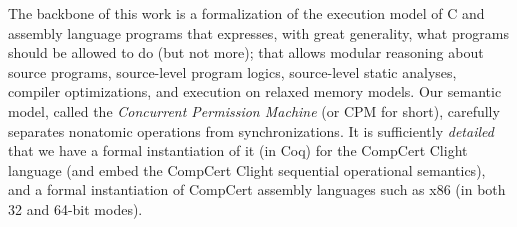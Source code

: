The backbone of this work
is a formalization of the execution model
of C and assembly language programs that expresses,
with great generality, what programs should be allowed to do (but not more);
that allows modular reasoning about source programs, source-level
program logics, source-level static analyses, compiler optimizations,
and execution on relaxed memory models.  Our semantic model, called the 
\emph{Concurrent Permission Machine} (or CPM for short), carefully
separates nonatomic operations from synchronizations.
It is sufficiently \emph{detailed} that we have a formal
instantiation of it (in Coq) for the CompCert Clight language
(and embed the CompCert Clight sequential operational semantics),
and a formal instantiation of CompCert assembly languages such as x86 (in both 32 and 64-bit modes).
%

